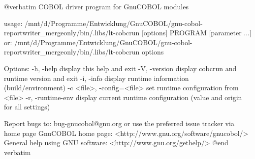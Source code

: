 @verbatim
COBOL driver program for GnuCOBOL modules

usage: /mnt/d/Programme/Entwicklung/GnuCOBOL/gnu-cobol-reportwriter_mergeonly/bin/.libs/lt-cobcrun [options] PROGRAM [parameter ...]
  or:  /mnt/d/Programme/Entwicklung/GnuCOBOL/gnu-cobol-reportwriter_mergeonly/bin/.libs/lt-cobcrun options

Options:
  -h, -help             display this help and exit
  -V, -version          display cobcrun and runtime version and exit
  -i, -info             display runtime information (build/environment)
  -c <file>, -config=<file>   set runtime configuration from <file>
  -r, -runtime-env      display current runtime configuration
                        (value and origin for all settings)

Report bugs to: bug-gnucobol@gnu.org or
use the preferred issue tracker via home page
GnuCOBOL home page: <http://www.gnu.org/software/gnucobol/>
General help using GNU software: <http://www.gnu.org/gethelp/>
@end verbatim

